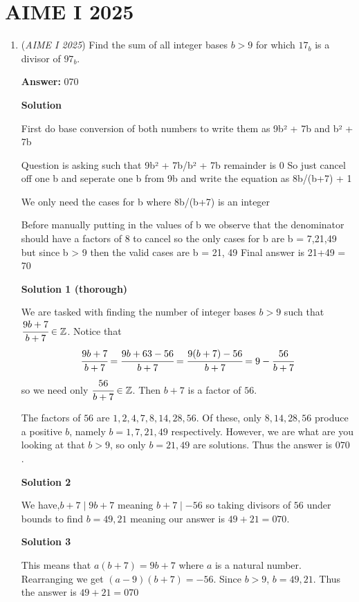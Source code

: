 \section{AIME I 2025}
        \begin{enumerate}
        	\item (\textit{AIME I 2025}) Find the sum of all integer bases $b > 9$ for which $17_b$ is a divisor of $97_b$.


 
 \textbf{Answer: }070



\textbf{Solution}

First do base conversion of both numbers to write them as 9b² + 7b and b² + 7b 

 Question is asking such that 9b² + 7b/b² + 7b remainder is 0 So just cancel off one b and seperate one b from 9b and write the equation as 8b/(b+7) + 1 

 We only need the cases for b where 8b/(b+7) is an integer 

 Before manually putting in the values of b we observe that the denominator should have a factors of 8 to cancel so the only cases for b are b = 7,21,49 but since b > 9 then the valid cases are b = 21, 49 Final answer is 21+49 = 70

 



\textbf{Solution 1 (thorough)}

We are tasked with finding the number of integer bases $b>9$ such that $\cfrac{9b+7}{b+7}\in\mathbb{Z}$. Notice that
 \[\cfrac{9b+7}{b+7}=\cfrac{9b+63-56}{b+7}=\cfrac{9(b+7)-56}{b+7}=9-\cfrac{56}{b+7}\]so we need only $\cfrac{56}{b+7}\in\mathbb{Z}$. Then $b+7$ is a factor of $56$.

 
The factors of $56$ are $1,2,4,7,8,14,28,56$. Of these, only $8,14,28,56$ produce a positive $b$, namely $b=1,7,21,49$ respectively. However, we are what are you looking at that $b>9$, so only $b=21,49$ are solutions. Thus the answer is $070$ .

 



\textbf{Solution 2}

We have,$b + 7 \mid 9b + 7$ meaning $b + 7 \mid -56$ so taking divisors of $56$ under bounds to find $b = 49, 21$ meaning our answer is $49+21=\boxed{070}.$




\textbf{Solution 3}

This means that $a(b+7)=9b+7$ where $a$ is a natural number. Rearranging we get $(a-9)(b+7)=-56$. Since $b>9$, $b=49,21$. Thus the answer is $49+21=\boxed{070}$





\end{enumerate}
